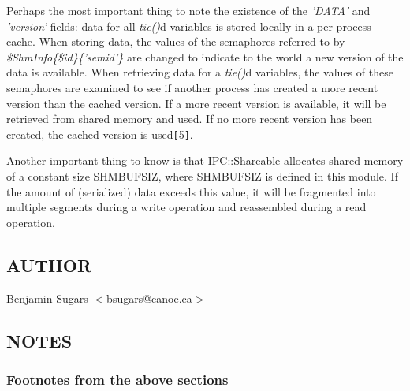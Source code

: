 Perhaps the most important thing to note the existence of the
{\em 'DATA'\/} and {\em 'version'\/} fields: data for all {\em tie()\/}d variables is
stored locally in a per-process cache.  When storing data, the values
of the semaphores referred to by {\em \$Shm\underscore{}Info\{\$id\}\{'sem\underscore{}id'\}\/} are
changed to indicate to the world a new version of the data is
available. When retrieving data for a {\em tie()\/}d variables, the values of
these semaphores are examined to see if another process has created a
more recent version than the cached version.  If a more recent version
is available, it will be retrieved from shared memory and used. If no
more recent version has been created, the cached version is used{\tt [}5{\tt ]}.

Another important thing to know is that IPC::Shareable allocates
shared memory of a constant size SHM\underscore{}BUFSIZ, where SHM\underscore{}BUFSIZ is
defined in this module.  If the amount of (serialized) data exceeds
this value, it will be fragmented into multiple segments during a
write operation and reassembled during a read operation.

\subsection*{AUTHOR}
Benjamin Sugars $<$bsugars@canoe.ca$>$

\subsection*{NOTES}
\subsubsection*{Footnotes from the above sections}%

